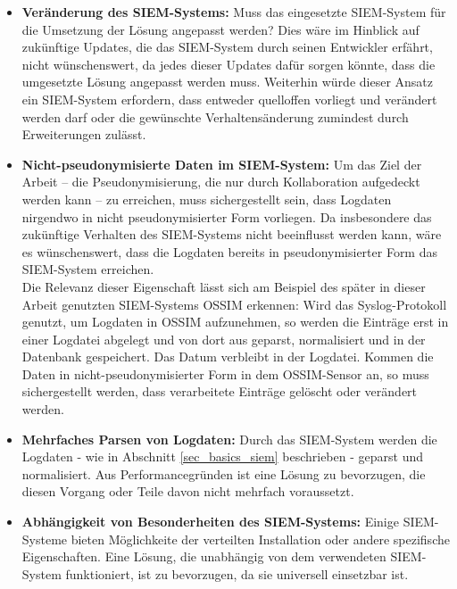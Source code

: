 \begin{itemize}

  \item \textbf{Veränderung des SIEM-Systems: } Muss das eingesetzte SIEM-System für die Umsetzung der Lösung angepasst werden? Dies wäre im Hinblick auf zukünftige Updates, die das SIEM-System durch seinen Entwickler erfährt, nicht wünschenswert, da jedes dieser Updates dafür sorgen könnte, dass die umgesetzte Lösung angepasst werden muss. Weiterhin würde dieser Ansatz ein SIEM-System erfordern, dass entweder quelloffen vorliegt und verändert werden darf oder die gewünschte Verhaltensänderung zumindest durch Erweiterungen zulässt. 
  
  \item \textbf{Nicht-pseudonymisierte Daten im SIEM-System: } Um das Ziel der Arbeit -- die Pseudonymisierung, die nur durch Kollaboration aufgedeckt werden kann -- zu erreichen, muss sichergestellt sein, dass Logdaten nirgendwo in nicht pseudonymisierter Form vorliegen. Da insbesondere das zukünftige Verhalten des SIEM-Systems nicht beeinflusst werden kann, wäre es wünschenswert, dass die Logdaten bereits in pseudonymisierter Form das SIEM-System erreichen.\\
  Die Relevanz dieser Eigenschaft lässt sich am Beispiel des später in dieser Arbeit genutzten SIEM-Systems OSSIM erkennen: Wird das Syslog-Protokoll genutzt, um Logdaten in OSSIM aufzunehmen, so werden die Einträge erst in einer Logdatei abgelegt und von dort aus geparst, normalisiert und in der Datenbank gespeichert. Das Datum verbleibt in der Logdatei. Kommen die Daten in nicht-pseudonymisierter Form in dem OSSIM-Sensor an, so muss sichergestellt werden, dass verarbeitete Einträge gelöscht oder verändert werden.
  
  \item \textbf{Mehrfaches Parsen von Logdaten: } Durch das SIEM-System werden die Logdaten - wie in Abschnitt \ref{sec_basics_siem} beschrieben - geparst und normalisiert. Aus Performancegründen ist eine Lösung zu bevorzugen, die diesen Vorgang oder Teile davon nicht mehrfach voraussetzt.
  
  \item \textbf{Abhängigkeit von Besonderheiten des SIEM-Systems: } Einige SIEM-Systeme bieten Möglichkeite der verteilten Installation oder andere spezifische Eigenschaften. Eine Lösung, die unabhängig von dem verwendeten SIEM-System funktioniert, ist zu bevorzugen, da sie universell einsetzbar ist.    
  

\end{itemize}


